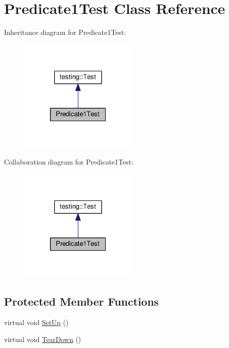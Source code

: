 \hypertarget{classPredicate1Test}{}\section{Predicate1\+Test Class Reference}
\label{classPredicate1Test}


Inheritance diagram for Predicate1\+Test\+:
\nopagebreak
\begin{figure}[H]
\begin{center}
\leavevmode
\includegraphics[width=163pt]{classPredicate1Test__inherit__graph}
\end{center}
\end{figure}


Collaboration diagram for Predicate1\+Test\+:
\nopagebreak
\begin{figure}[H]
\begin{center}
\leavevmode
\includegraphics[width=163pt]{classPredicate1Test__coll__graph}
\end{center}
\end{figure}
\subsection*{Protected Member Functions}
\begin{DoxyCompactItemize}
\item 
virtual void \hyperlink{classPredicate1Test_a481704a09f73a37158513f9a336dbdd9}{Set\+Up} ()
\item 
virtual void \hyperlink{classPredicate1Test_ad2974af5c6abc508847c3a9912b24a90}{Tear\+Down} ()
\end{DoxyCompactItemize}
